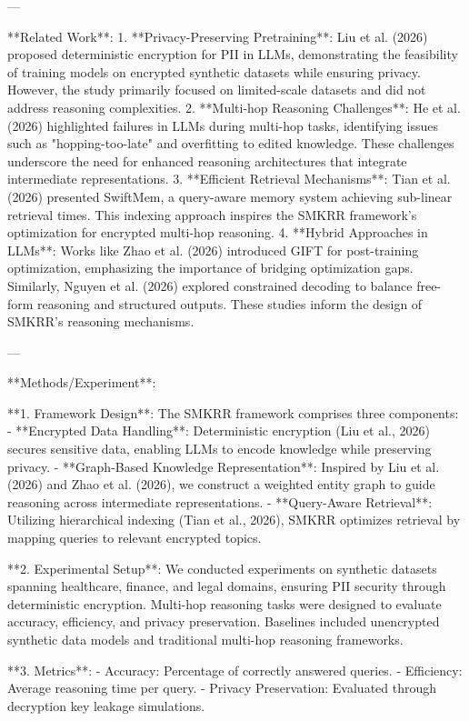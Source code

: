 ---

**Related Work**:  
1. **Privacy-Preserving Pretraining**: Liu et al. (2026) proposed deterministic encryption for PII in LLMs, demonstrating the feasibility of training models on encrypted synthetic datasets while ensuring privacy. However, the study primarily focused on limited-scale datasets and did not address reasoning complexities.  
2. **Multi-hop Reasoning Challenges**: He et al. (2026) highlighted failures in LLMs during multi-hop tasks, identifying issues such as "hopping-too-late" and overfitting to edited knowledge. These challenges underscore the need for enhanced reasoning architectures that integrate intermediate representations.  
3. **Efficient Retrieval Mechanisms**: Tian et al. (2026) presented SwiftMem, a query-aware memory system achieving sub-linear retrieval times. This indexing approach inspires the SMKRR framework's optimization for encrypted multi-hop reasoning.  
4. **Hybrid Approaches in LLMs**: Works like Zhao et al. (2026) introduced GIFT for post-training optimization, emphasizing the importance of bridging optimization gaps. Similarly, Nguyen et al. (2026) explored constrained decoding to balance free-form reasoning and structured outputs. These studies inform the design of SMKRR's reasoning mechanisms.  

---

**Methods/Experiment**:  

**1. Framework Design**:  
The SMKRR framework comprises three components:  
- **Encrypted Data Handling**: Deterministic encryption (Liu et al., 2026) secures sensitive data, enabling LLMs to encode knowledge while preserving privacy.  
- **Graph-Based Knowledge Representation**: Inspired by Liu et al. (2026) and Zhao et al. (2026), we construct a weighted entity graph to guide reasoning across intermediate representations.  
- **Query-Aware Retrieval**: Utilizing hierarchical indexing (Tian et al., 2026), SMKRR optimizes retrieval by mapping queries to relevant encrypted topics.  

**2. Experimental Setup**:  
We conducted experiments on synthetic datasets spanning healthcare, finance, and legal domains, ensuring PII security through deterministic encryption. Multi-hop reasoning tasks were designed to evaluate accuracy, efficiency, and privacy preservation. Baselines included unencrypted synthetic data models and traditional multi-hop reasoning frameworks.  

**3. Metrics**:  
- Accuracy: Percentage of correctly answered queries.  
- Efficiency: Average reasoning time per query.  
- Privacy Preservation: Evaluated through decryption key leakage simulations.  


